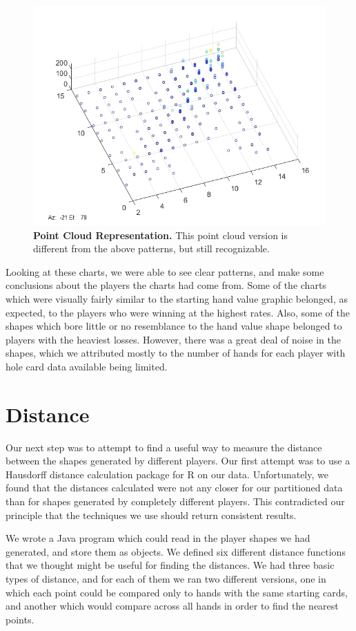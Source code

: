 \documentclass[11pt]{article}
\begin{document}
\begin{figure}[ht!]
		\includegraphics[width=.45\textwidth]{f1.png}
  		\caption{\textbf{Point Cloud Representation.} This point cloud version
  		is different from the above patterns, but still recognizable.}
\end{figure}

Looking at these charts, we were able to see clear patterns, and make some
conclusions about the players the charts had come from. Some of the charts which
were visually fairly similar to the starting hand value graphic belonged, as
expected, to the players who were winning at the highest rates. Also,
some of the shapes which bore little or no resemblance to the hand value shape
belonged to players with the heaviest losses. However, there was a great deal
of noise in the shapes, which we attributed mostly to the number of hands for each
player with hole card data available being limited.

\section*{Distance}
Our next step was to attempt to find a useful way to measure the distance
between the shapes generated by different players. Our
first attempt was to use a Hausdorff distance calculation package for R on our 
data. Unfortunately, we found that the distances calculated were not any closer
for our partitioned data than for shapes generated by completely different players.
This contradicted our principle that the techniques we use should return consistent
results.

We wrote a Java program which could read in the player shapes we had generated,
and store them as objects. We defined six different distance functions that we
thought might be useful for finding the distances. We had three basic types of
distance, and for each of them we ran two different versions, one in which each
point could be compared only to hands with the same starting cards, and another
which would compare across all hands in order to find the nearest points.
\end{document}
